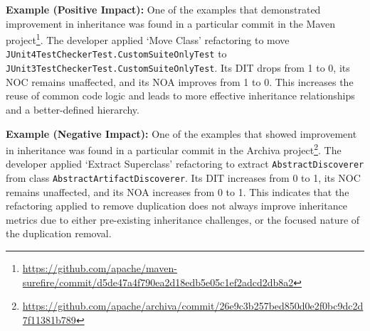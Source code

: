 \noindent\textbf{Example (Positive Impact):} One of the examples that demonstrated improvement in inheritance was found
in a particular commit in the Maven project\footnote{\textcolor{black}{\url{https://github.com/apache/maven-surefire/commit/d5de47a4f790ea2d18edb5e05c1ef2adcd2db8a2}}}.  The developer applied `Move Class' refactoring to move \texttt{JUnit4TestChecker\break Test.CustomSuiteOnlyTest} to \texttt{JUnit3TestCheckerTest.CustomSuiteOnlyTest}. Its DIT drops from 1 to 0, its NOC remains unaffected, and its NOA improves from 1 to 0. This increases the reuse of common code logic and leads to more effective inheritance relationships and a better-defined hierarchy.

\noindent\textbf{Example (Negative Impact):} One of the examples that showed improvement in inheritance was found
in a particular commit in the Archiva project\footnote{\textcolor{black}{\url{https://github.com/apache/archiva/commit/26e9c3b257bed850d0e2f0bc9dc2d7f11381b789}}}.  The developer applied `Extract Superclass' refactoring to extract \texttt{AbstractDiscoverer} from class \texttt{AbstractArtifactDiscoverer}. Its DIT increases from 0 to 1, its NOC remains unaffected, and its NOA increases from 0 to 1. This indicates that the refactoring applied to remove duplication does not always improve inheritance metrics due to either pre-existing inheritance challenges, or the focused nature of the duplication removal. 


